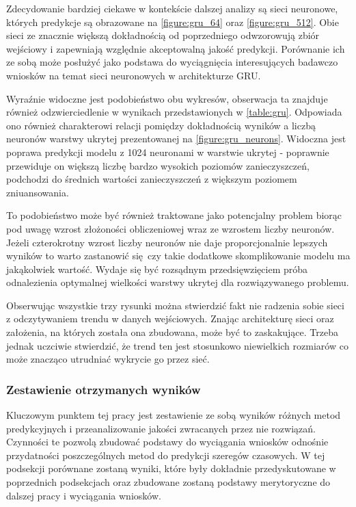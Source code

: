 \documentclass[10pt,a4paper]{article}
\begin{document}
Zdecydowanie bardziej ciekawe w kontekście dalszej analizy są sieci neuronowe, których predykcje są obrazowane na \autoref{figure:gru_64} oraz \autoref{figure:gru_512}. Obie sieci ze znacznie większą dokładnością od poprzedniego odwzorowują zbiór wejściowy i zapewniają względnie akceptowalną jakość predykcji. Porównanie ich ze sobą może posłużyć jako podstawa do wyciągnięcia interesujących badawczo wniosków na temat sieci neuronowych w architekturze GRU. 

Wyraźnie widoczne jest podobieństwo obu wykresów, obserwacja ta znajduje również odzwierciedlenie w wynikach przedstawionych w \autoref{table:gru}. Odpowiada ono również charakterowi relacji pomiędzy dokładnością wyników a liczbą neuronów warstwy ukrytej prezentowanej na \autoref{figure:gru_neurons}. Widoczna jest poprawa predykcji modelu z 1024 neuronami w warstwie ukrytej - poprawnie przewiduje on większą liczbę bardzo wysokich poziomów zanieczyszczeń, podchodzi do średnich wartości zanieczyszczeń z większym poziomem zniuansowania.

To podobieństwo może być również traktowane jako potencjalny problem biorąc pod uwagę wzrost złożoności obliczeniowej wraz ze wzrostem liczby neuronów. Jeżeli czterokrotny wzrost liczby neuronów nie daje proporcjonalnie lepszych wyników to warto zastanowić się czy takie dodatkowe skomplikowanie modelu ma jakąkolwiek wartość. Wydaje się być rozsądnym przedsięwzięciem próba odnalezienia optymalnej wielkości warstwy ukrytej dla rozwiązywanego problemu. 

Obserwując wszystkie trzy rysunki można stwierdzić fakt nie radzenia sobie sieci z odczytywaniem trendu w danych wejściowych. Znając architekturę sieci oraz założenia, na których została ona zbudowana, może być to zaskakujące. Trzeba jednak uczciwie stwierdzić, że trend ten jest stosunkowo niewielkich rozmiarów co może znacząco utrudniać wykrycie go przez sieć. 

\subsubsection{Zestawienie otrzymanych wyników}
Kluczowym punktem tej pracy jest zestawienie ze sobą wyników różnych metod predykcyjnych i przeanalizowanie jakości zwracanych przez nie rozwiązań. Czynności te pozwolą zbudować podstawy do wyciągania wniosków odnośnie przydatności poszczególnych metod do predykcji szeregów czasowych. W tej podsekcji porównane zostaną wyniki, które były dokładnie przedyskutowane w poprzednich podsekcjach oraz zbudowane zostaną podstawy merytoryczne do dalszej pracy i wyciągania wniosków. 
\end{document}
